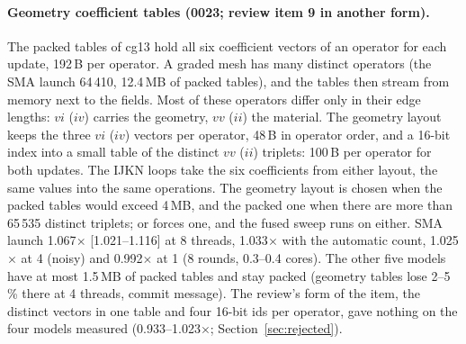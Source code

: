 \paragraph{Geometry coefficient tables (0023; review item 9 in another form).} The packed tables of cg13 hold all six
coefficient vectors of an operator for each update, 192\,B per operator. A graded mesh has many distinct operators
(the SMA launch 64\,410, 12.4\,MB of packed tables), and the tables then stream from memory next to the fields. Most of
these operators differ only in their edge lengths: $vi$ ($iv$) carries the geometry, $vv$ ($ii$) the material. The
geometry layout keeps the three $vi$ ($iv$) vectors per operator, 48\,B in operator order, and a 16-bit index into a
small table of the distinct $vv$ ($ii$) triplets: 100\,B per operator for both updates. The IJKN loops take the six
coefficients from either layout, the same values into the same operations. The geometry layout is chosen when the
packed tables would exceed 4\,MB, and the packed one when there are more than 65\,535 distinct triplets;
 or  forces one, and the fused sweep runs on either. SMA launch 1.067$\times$
[1.021--1.116] at 8 threads, 1.033$\times$ with the automatic count, 1.025$\times$ at 4 (noisy) and 0.992$\times$ at 1
(8 rounds, 0.3--0.4 cores). The other five models have at most 1.5\,MB of packed tables and stay packed (geometry
tables lose 2--5\,\% there at 4 threads, commit message). The review's form of the item, the distinct vectors in one
table and four 16-bit ids per operator, gave nothing on the four models measured (0.933--1.023$\times$;
Section~\ref{sec:rejected}).

